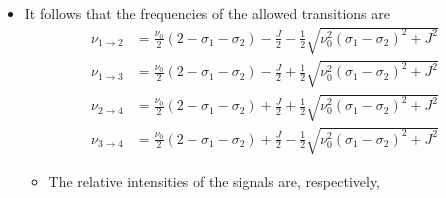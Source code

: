 \documentclass[../notes.tex]{subfiles}
\begin{document}
\begin{itemize}
\begin{itemize}
        \begin{equation*}
            \begin{vNiceMatrix}
                -d_1-d_2+\frac{hJ}{4}-E & 0 & 0 & 0\\
                0 & -d_1+d_2-\frac{hJ}{4}-E & \frac{hJ}{2} & 0\\
                0 & \frac{hJ}{2} & d_1-d_2-\frac{hJ}{4}-E & 0\\
                0 & 0 & 0 & d_1+d_2+\frac{hJ}{4}-E\\
            \end{vNiceMatrix}
            = 0
        \end{equation*}
        \begin{itemize}
            \item Note that in the following, $d_1=\frac{1}{2}h\nu_0(1-\sigma_1)$, $d_2=\frac{1}{2}h\nu_0(1-\sigma_2)$, and we drop the 12 subscript on $J$ for convenience.
        \end{itemize}
        \item Expanding yields the following energy levels.
        \begin{align*}
            E_1 &= -h\nu_0\left( 1-\frac{\sigma_1+\sigma_2}{2} \right)+\frac{hJ}{4}&
            E_2 &= -\frac{hJ}{4}-\frac{h}{2}\sqrt{\nu_0^2(\sigma_1-\sigma_2)^2+J^2}\\
            E_3 &= -\frac{hJ}{4}+\frac{h}{2}\sqrt{\nu_0^2(\sigma_1-\sigma_2)^2+J^2}&
            E_4 &= h\nu_0\left( 1-\frac{\sigma_1+\sigma_2}{2} \right)+\frac{hJ}{4}
        \end{align*}
    \end{itemize}
    \item It follows that the frequencies of the allowed transitions are
    \begin{align*}
        \nu_{1\to 2} &= \frac{\nu_0}{2}(2-\sigma_1-\sigma_2)-\frac{J}{2}-\frac{1}{2}\sqrt{\nu_0^2(\sigma_1-\sigma_2)^2+J^2}\\
        \nu_{1\to 3} &= \frac{\nu_0}{2}(2-\sigma_1-\sigma_2)-\frac{J}{2}+\frac{1}{2}\sqrt{\nu_0^2(\sigma_1-\sigma_2)^2+J^2}\\
        \nu_{2\to 4} &= \frac{\nu_0}{2}(2-\sigma_1-\sigma_2)+\frac{J}{2}+\frac{1}{2}\sqrt{\nu_0^2(\sigma_1-\sigma_2)^2+J^2}\\
        \nu_{3\to 4} &= \frac{\nu_0}{2}(2-\sigma_1-\sigma_2)+\frac{J}{2}-\frac{1}{2}\sqrt{\nu_0^2(\sigma_1-\sigma_2)^2+J^2}
    \end{align*}
    \begin{itemize}
        \item The relative intensities of the signals are, respectively,

\end{itemize}
\end{itemize}
\end{document}
